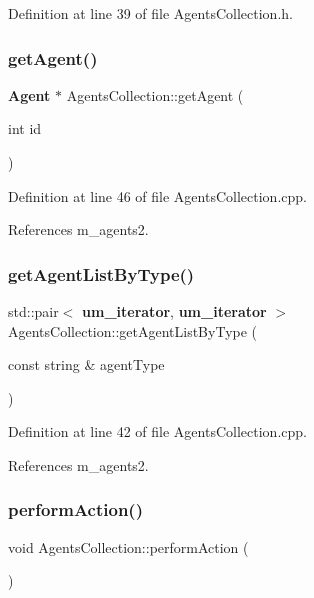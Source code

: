 Definition at line 39 of file Agents\+Collection.\+h.

\mbox{\label{class_agents_collection_a497e22074302b7fdc101ac98ed840610}} 
\subsubsection{getAgent()}
{\footnotesize\ttfamily \textbf{ Agent} $\ast$ Agents\+Collection\+::get\+Agent (\begin{DoxyParamCaption}\item[{int}]{id }\end{DoxyParamCaption})}



Definition at line 46 of file Agents\+Collection.\+cpp.



References m\+\_\+agents2.

\mbox{\label{class_agents_collection_ae8f3b548e2eefb12ed3d3596a6be4598}} 
\subsubsection{getAgentListByType()}
{\footnotesize\ttfamily std\+::pair$<$ \textbf{ um\+\_\+iterator}, \textbf{ um\+\_\+iterator} $>$ Agents\+Collection\+::get\+Agent\+List\+By\+Type (\begin{DoxyParamCaption}\item[{const string \&}]{agent\+Type }\end{DoxyParamCaption})}



Definition at line 42 of file Agents\+Collection.\+cpp.



References m\+\_\+agents2.

\mbox{\label{class_agents_collection_a7f1dd7f10d1d5aa646ebd855c3ff5502}} 
\subsubsection{performAction()}
{\footnotesize\ttfamily void Agents\+Collection\+::perform\+Action (\begin{DoxyParamCaption}{ }\end{DoxyParamCaption})}

